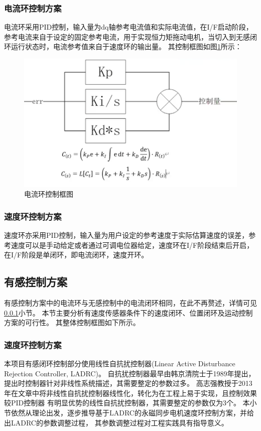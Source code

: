 ﻿\documentclass[12pt,a4paper]{article}
\begin{document}
\subsubsection{电流环控制方案} \label{电流环小节}
电流环采用PID控制，输入量为dq轴参考电流值和实际电流值，在I/F启动阶段，参考电流来自于设定的固定参考电流，用于实现恒力矩拖动电机，当切入到无感闭环运行状态时，电流参考值来自于速度环的输出量。
其控制框图如图\ref{Con5}所示：
\begin{figure}
  \centering
  \includegraphics[width=\textwidth]{./picture/电流环.png}
  \caption{电流环控制框图}
  \label{Con5}
\end{figure}


\subsubsection{速度环控制方案}
速度环亦采用PID控制，输入量为用户设定的参考速度于实际估算速度的误差，参考速度可以是手动给定或者通过可调电位器给定，速度环在I/F阶段结束后开启，在I/F阶段是单闭环，即电流闭环，速度开环。

\subsection{有感控制方案}
有感控制方案中的电流环与无感控制中的电流闭环相同，在此不再赘述，详情可见\ref{电流环小节}小节。
本节主要分析有速度传感器条件下的速度闭环、位置闭环及运动控制方案的可行性。
其整体控制框图如下所示。

\subsubsection{速度环控制方案}
本项目有感闭环控制部分使用线性自抗扰控制器(Linear Active Disturbance Rejection Controller, LADRC)。
自抗扰控制器最早由韩京清院士于1989年提出，提出时控制器针对非线性系统描述，其需要整定的参数过多。
高志强教授于2013年在文章\cite{zhiqiang_gao_scaling_2003}中将非线性自抗扰控制器线性化，转化为在工程上易于实现，且控制效果较PID控制器
有明显优势的线性自抗扰控制器，其需要整定的参数仅为3个。
本小节依然从理论出发，逐步推导基于LADRC的永磁同步电机速度环控制方案\cite{Zhong2020}，并给出LADRC的参数调整过程，
其参数调整过程对工程实践具有指导意义。
\end{document}
